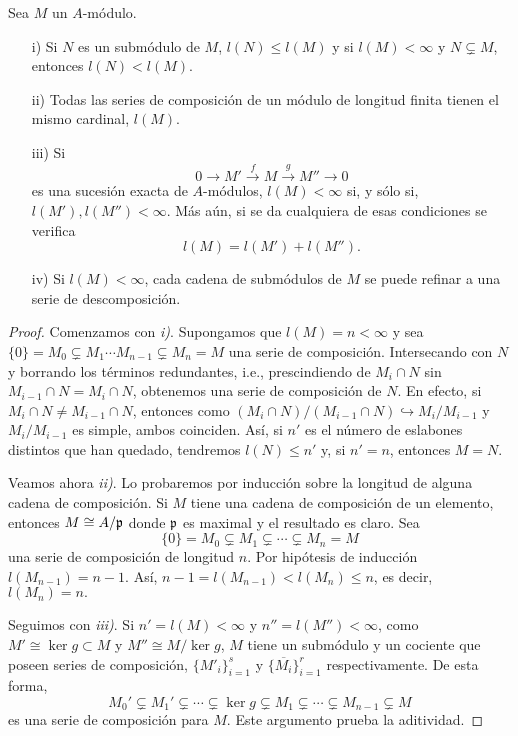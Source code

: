 \documentclass[../main.tex]{subfiles}
\begin{document}
\begin{theorem}
Sea $M$ un $A$-módulo.
\begin{itemize}
    \item[i)] Si $N$ es un submódulo de $M$, $l(N)\le l(M)$ y si $l(M)<\infty$ y $N\subsetneq M$, entonces $l(N)<l(M).$
    \item[ii)] Todas las series de composición de un módulo de longitud finita tienen el mismo cardinal, $l(M).$
    \item[iii)] Si
    $$0\rightarrow M'\overset{f}{\rightarrow} M\overset{g}{\rightarrow}M''\rightarrow 0$$
    es una sucesión exacta de $A$-módulos, $l(M)<\infty$ si, y sólo si, $l(M'),l(M'')<\infty.$ Más aún, si se da cualquiera de esas condiciones se verifica 
    $$l(M)=l(M')+l(M'').$$
    \item[iv)] Si $l(M)<\infty$, cada cadena de submódulos de $M$ se puede refinar a una serie de descomposición.
\end{itemize}
\end{theorem}
\begin{proof}
Comenzamos con \textit{i)}. Supongamos que $l(M)=n<\infty$ y sea $\{0\}=M_0\subsetneq M_1\cdots M_{n-1}\subsetneq M_n=M$ una serie de composición. Intersecando con $N$ y borrando los términos redundantes, i.e., prescindiendo de $M_i\cap N$ sin $M_{i-1}\cap N=M_i\cap N$, obtenemos una serie de composición de $N.$ En efecto, si $M_i\cap N\neq M_{i-1}\cap N$, entonces como $(M_i\cap N)/(M_{i-1}\cap N)\hookrightarrow M_i/M_{i-1}$ y $M_i/M_{i-1}$ es simple, ambos coinciden. Así, si $n'$ es el número de eslabones distintos que han quedado, tendremos $l(N)\le n'$ y, si $n'=n$, entonces $M=N.$

Veamos ahora \textit{ii)}. Lo probaremos por inducción sobre la longitud de alguna cadena de composición. Si $M$ tiene una cadena de composición de un elemento, entonces $M\cong A/\mathfrak{p}$ donde $\mathfrak{p}$ es maximal y el resultado es claro. Sea
$$\{0\}=M_0\subsetneq M_1\subsetneq\cdots\subsetneq M_n=M$$
una serie de composición de longitud $n.$ Por hipótesis de inducción $l(M_{n-1})=n-1.$ Así, $n-1=l(M_{n-1})<l(M_n)\le n$, es decir, $l(M_n)=n.$

Seguimos con \textit{iii)}. Si $n'=l(M)<\infty$ y $n''=l(M'')<\infty$, como $M'\cong \ker g\subset M$ y $M''\cong M/\ker g$, $M$ tiene un submódulo y un cociente que poseen series de composición, $\{M'_i\}_{i=1}^s$ y $\{\overline{M_i}\}_{i=1}^r$ respectivamente. De esta forma,
$$M_0'\subsetneq M_1'\subsetneq\cdots\subsetneq\ker g\subsetneq M_1\subsetneq\cdots\subsetneq M_{n-1}\subsetneq M$$
es una serie de composición para $M.$ Este argumento prueba la aditividad.
\end{proof}
\end{document}
